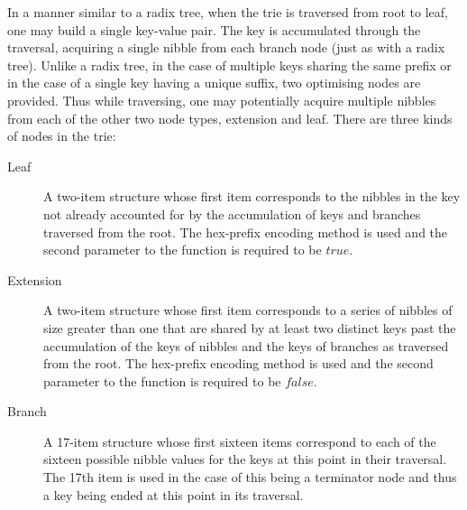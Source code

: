 \documentclass[9pt,oneside]{amsart}
\begin{document}
In a manner similar to a radix tree, when the trie is traversed from root to leaf, one may build a single key-value pair. The key is accumulated through the traversal, acquiring a single nibble from each branch node (just as with a radix tree). Unlike a radix tree, in the case of multiple keys sharing the same prefix or in the case of a single key having a unique suffix, two optimising nodes are provided. Thus while traversing, one may potentially acquire multiple nibbles from each of the other two node types, extension and leaf. There are three kinds of nodes in the trie:
\begin{description}
\item[Leaf] A two-item structure whose first item corresponds to the nibbles in the key not already accounted for by the accumulation of keys and branches traversed from the root. The hex-prefix encoding method is used and the second parameter to the function is required to be $true$.
\item[Extension] A two-item structure whose first item corresponds to a series of nibbles of size greater than one that are shared by at least two distinct keys past the accumulation of the keys of nibbles and the keys of branches as traversed from the root. The hex-prefix encoding method is used and the second parameter to the function is required to be $false$.
\item[Branch] A 17-item structure whose first sixteen items correspond to each of the sixteen possible nibble values for the keys at this point in their traversal. The 17th item is used in the case of this being a terminator node and thus a key being ended at this point in its traversal.
\end{description}
\end{document}
